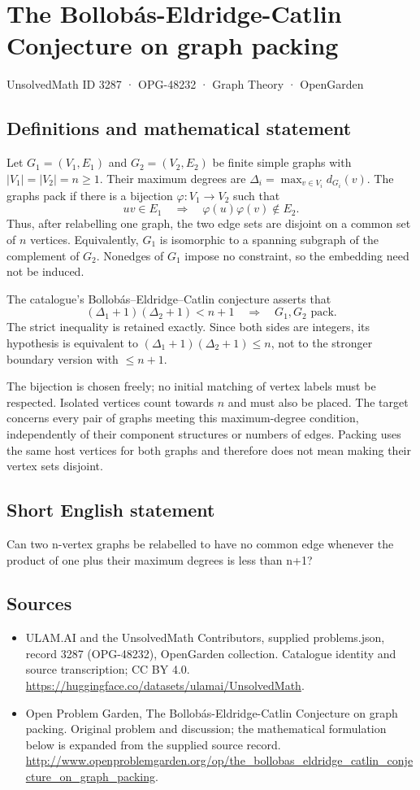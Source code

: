 \documentclass[11pt,a4paper]{article}
\begin{document}
\section*{The Bollobás-Eldridge-Catlin Conjecture on graph packing}\label{3287}
{\small UnsolvedMath ID 3287 · OPG-48232 · Graph Theory · OpenGarden}
\subsection{Definitions and mathematical statement}
Let $G_1=(V_1,E_1)$ and $G_2=(V_2,E_2)$ be finite simple graphs with
$|V_1|=|V_2|=n\ge1$. Their maximum degrees are
$\Delta_i=\max_{v\in V_i}d_{G_i}(v)$. The graphs pack if there is a
bijection $\varphi:V_1\to V_2$ such that
\[
                  uv\in E_1\quad\Longrightarrow\quad
                  \varphi(u)\varphi(v)\notin E_2.
\]
Thus, after relabelling one graph, the two edge sets are disjoint on
a common set of $n$ vertices. Equivalently, $G_1$ is isomorphic to a
spanning subgraph of the complement of $G_2$. Nonedges of $G_1$ impose
no constraint, so the embedding need not be induced.

The catalogue's Bollobás--Eldridge--Catlin conjecture asserts that
\[
                       (\Delta_1+1)(\Delta_2+1)<n+1
              \quad\Longrightarrow\quad G_1,G_2\text{ pack}.
\]
The strict inequality is retained exactly. Since both sides are
integers, its hypothesis is equivalent to
$(\Delta_1+1)(\Delta_2+1)\le n$, not to the stronger boundary version
with $\le n+1$.

The bijection is chosen freely; no initial matching of vertex labels
must be respected. Isolated vertices count towards $n$ and must also
be placed. The target concerns every pair of graphs meeting this
maximum-degree condition, independently of their component structures
or numbers of edges. Packing uses the same host vertices for both
graphs and therefore does not mean making their vertex sets disjoint.
\subsection{Short English statement}
Can two n-vertex graphs be relabelled to have no common edge whenever the product of one plus their maximum degrees is less than n+1?
\subsection{Sources}
\begin{itemize}
\item[S1] ULAM.AI and the UnsolvedMath Contributors, supplied problems.json, record 3287 (OPG-48232), OpenGarden collection. Catalogue identity and source transcription; CC BY 4.0.
\url{https://huggingface.co/datasets/ulamai/UnsolvedMath}.
\item[S2] Open Problem Garden, The Bollobás-Eldridge-Catlin Conjecture on graph packing. Original problem and discussion; the mathematical formulation below is expanded from the supplied source record.
\url{http://www.openproblemgarden.org/op/the_bollobas_eldridge_catlin_conjecture_on_graph_packing}.
\end{itemize}
\end{document}
